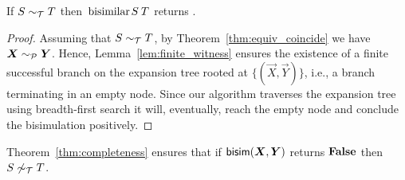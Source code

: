 \begin{theorem}[Completeness]
\label{thm:completeness}
  If $S \sim_\mathcal T T$ then $\bisimf S T$ returns
  .
\end{theorem}
%
\begin{proof}
  Assuming that $S \sim_\mathcal T T$, by Theorem~\ref{thm:equiv_coincide}
  we have $\vec X \ProdEquiv \vec Y$.  Hence,
  Lemma~\ref{lem:finite_witness} ensures the existence of a finite
  successful branch on the expansion tree rooted at
  $\{(\vec X,\vec Y)\}$, i.e., a branch terminating in an empty
  node.  Since our algorithm traverses the expansion tree using
  breadth-first search it will, eventually, reach the empty node and
  conclude the bisimulation positively.
\end{proof}

Theorem~\ref{thm:completeness} ensures that if $\Bisim(\vec X,\vec Y)$
returns $\mathbf{False}$ then $S \not\sim_\mathcal T T$. 



